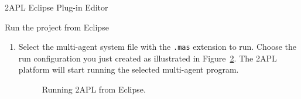 \begin{chapter}{2APL Eclipse Plug-in Editor}
\begin{section}{Run the project from Eclipse}
\begin{enumerate}
        These steps are illustrated in Figure~\ref{fig:platform}.
        Note that the required paths are correctly entered. It is also important to note that
        the behavior of the run configuration can be modified by changing the
        Arguments. Add the option \texttt{-nogui} after \texttt{-nojade} to
        disable the 2APL GUI. Or leave the \texttt{-nojade} option out of the
        Arguments to get a choice to enable the jade platform.
        \begin{figure}[ht]
                \begin{center}
                \end{center}
                \caption{Creating a direct 2APL Run item in Eclipse.}\label{fig:platform}
            \end{figure}

    \item Select the multi-agent system file with the \texttt{.mas} extension to run.
    Choose the run configuration you just created as illustrated in
    Figure~\ref{fig:run}. The 2APL platform will start running the selected multi-agent program.
        \begin{figure}[ht]
            \begin{center}
            \end{center}
            \caption{Running 2APL from Eclipse.}\label{fig:run}
        \end{figure}

    \end{enumerate}
\end{section}
\end{chapter}
